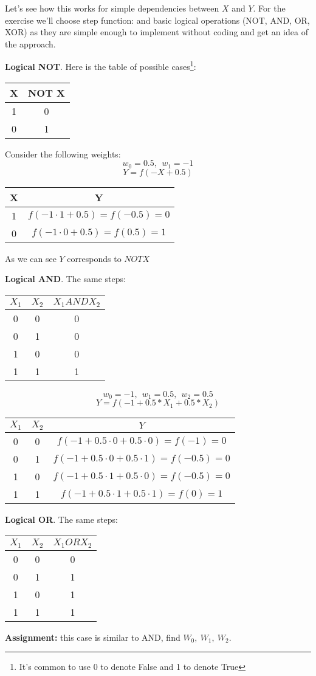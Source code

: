 Let's see how this works for simple dependencies between $X$ and $Y$.
For the exercise we'll choose step function:
and basic logical operations (NOT, AND, OR, XOR) as they are
simple enough to implement without coding and get an idea of the
approach.

\textbf{Logical NOT}.
Here is the table of possible cases\footnote{It's common to use 0
to denote False and 1 to denote True}:
\begin{center}
\begin{tabular}{c|c}
X & NOT X \\
\hline
1&0\\
0&1
\end{tabular}
\end{center}
Consider the following weights:
$$
w_0 = 0.5,\ \ w_1 = -1
$$
$$
Y = f(-X+0.5)
$$
\begin{center}
\begin{tabular}{c|c}
X & Y \\
\hline
1&$f(-1\cdot 1+0.5)=f(-0.5)=0$ \\
0&$f(-1\cdot 0+0.5)=f(0.5)=1$ 
\end{tabular}
\end{center}
As we can see $Y$ corresponds to $NOT X$

\textbf{Logical AND}. The same steps:
\begin{center}
\begin{tabular}{c|c|c}
$X_1$ & $X_2$ & $X_1 AND X_2$ \\
\hline
0&0&0 \\
0&1&0 \\
1&0&0 \\
1&1&1
\end{tabular}
\end{center}
$$
w_0 = -1, \ \ w_1 = 0.5, \ \ w_2 = 0.5
$$
$$
Y = f(-1+0.5*X_1+0.5*X_2)
$$
\begin{center}
\begin{tabular}{c|c|c}
$X_1$ & $X_2$ & $Y$ \\
\hline
0&0&$f(-1+0.5\cdot 0+0.5\cdot 0) = f(-1) = 0$   \\
0&1&$f(-1+0.5\cdot 0+0.5\cdot 1) = f(-0.5) = 0$ \\
1&0&$f(-1+0.5\cdot 1+0.5\cdot 0) = f(-0.5) = 0$ \\
1&1&$f(-1+0.5\cdot 1+0.5\cdot 1) = f(0) = 1$
\end{tabular}
\end{center}

\textbf{Logical OR}. The same steps:
\begin{center}
\begin{tabular}{c|c|c}
$X_1$ & $X_2$ & $X_1 OR X_2$ \\
\hline
0&0&0 \\
0&1&1 \\
1&0&1 \\
1&1&1
\end{tabular}
\end{center}
\begin{tcolorbox}
\textbf{Assignment:} this case is similar to AND, find $W_0, \ W_1, \ W_2$.
\end{tcolorbox}

